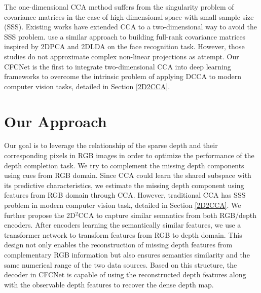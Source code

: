 \documentclass{article}
\begin{document}
The one-dimensional CCA method suffers from the singularity problem of covariance matrices in the case of high-dimensional space with small sample size (SSS). Existing works have extended CCA to a two-dimensional way to avoid the SSS problem. \cite{kukharev2010application,zou20072dcca,lee2007two} use a similar approach to building full-rank covariance matrices inspired by 2DPCA \cite{yang2004two} and 2DLDA \cite{li2004novel} on the face recognition task. However, those studies do not approximate complex non-linear projections as \cite{andrew2013deep, wang2015deep} attempt. Our CFCNet is the first to integrate two-dimensional CCA into deep learning frameworks to overcome the intrinsic problem of applying DCCA to modern computer vision tasks, detailed in Section \ref{2D2CCA}.

\section{Our Approach}
\label{approach}

Our goal is to leverage the relationship of the sparse depth and their corresponding pixels in RGB images in order to optimize the performance of the depth completion task. We try to complement the missing depth components using cues from RGB domain. Since CCA could learn the shared subspace with its predictive characteristics, we estimate the missing depth component using features from RGB domain through CCA. However, traditional CCA has SSS problem in modern computer vision task, detailed in Section \ref{2D2CCA}. We further propose the 2D$^2$CCA to capture similar semantics from both RGB/depth encoders. After encoders learning the semantically similar features, we use a transformer network to transform features from RGB to depth domain. This design not only enables the reconstruction of missing depth features from complementary RGB information but also ensures semantics similarity and the same numerical range of the two data sources. Based on this structure, the decoder in CFCNet is capable of using the reconstructed depth features along with the observable depth features to recover the dense depth map.
\end{document}
